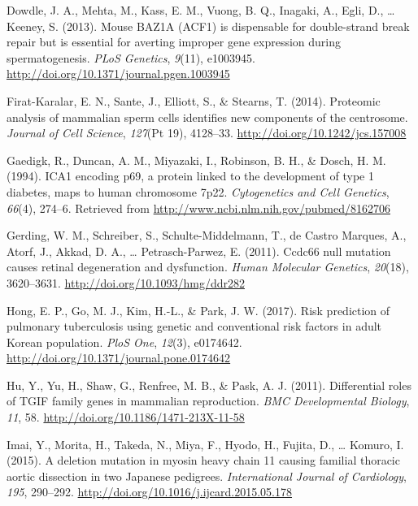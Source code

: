 \documentclass[12pt,twoside]{reedthesis}
\theoremstyle{definition}
\theoremstyle{definition}
\theoremstyle{remark}
\begin{document}
  \hypertarget{ref-Dowdle2013}{}
  Dowdle, J. A., Mehta, M., Kass, E. M., Vuong, B. Q., Inagaki, A., Egli,
  D., \ldots{} Keeney, S. (2013). Mouse BAZ1A (ACF1) is dispensable for
  double-strand break repair but is essential for averting improper gene
  expression during spermatogenesis. \emph{PLoS Genetics}, \emph{9}(11),
  e1003945. \url{http://doi.org/10.1371/journal.pgen.1003945}
  
  \hypertarget{ref-Firat-Karalar2014}{}
  Firat-Karalar, E. N., Sante, J., Elliott, S., \& Stearns, T. (2014).
  Proteomic analysis of mammalian sperm cells identifies new components of
  the centrosome. \emph{Journal of Cell Science}, \emph{127}(Pt 19),
  4128--33. \url{http://doi.org/10.1242/jcs.157008}
  
  \hypertarget{ref-Gaedigk1994}{}
  Gaedigk, R., Duncan, A. M., Miyazaki, I., Robinson, B. H., \& Dosch, H.
  M. (1994). ICA1 encoding p69, a protein linked to the development of
  type 1 diabetes, maps to human chromosome 7p22. \emph{Cytogenetics and
  Cell Genetics}, \emph{66}(4), 274--6. Retrieved from
  \url{http://www.ncbi.nlm.nih.gov/pubmed/8162706}
  
  \hypertarget{ref-Gerding2011}{}
  Gerding, W. M., Schreiber, S., Schulte-Middelmann, T., de Castro
  Marques, A., Atorf, J., Akkad, D. A., \ldots{} Petrasch-Parwez, E.
  (2011). Ccdc66 null mutation causes retinal degeneration and
  dysfunction. \emph{Human Molecular Genetics}, \emph{20}(18), 3620--3631.
  \url{http://doi.org/10.1093/hmg/ddr282}
  
  \hypertarget{ref-Hong2017}{}
  Hong, E. P., Go, M. J., Kim, H.-L., \& Park, J. W. (2017). Risk
  prediction of pulmonary tuberculosis using genetic and conventional risk
  factors in adult Korean population. \emph{PloS One}, \emph{12}(3),
  e0174642. \url{http://doi.org/10.1371/journal.pone.0174642}
  
  \hypertarget{ref-Hu2011}{}
  Hu, Y., Yu, H., Shaw, G., Renfree, M. B., \& Pask, A. J. (2011).
  Differential roles of TGIF family genes in mammalian reproduction.
  \emph{BMC Developmental Biology}, \emph{11}, 58.
  \url{http://doi.org/10.1186/1471-213X-11-58}
  
  \hypertarget{ref-Imai2015}{}
  Imai, Y., Morita, H., Takeda, N., Miya, F., Hyodo, H., Fujita, D.,
  \ldots{} Komuro, I. (2015). A deletion mutation in myosin heavy chain 11
  causing familial thoracic aortic dissection in two Japanese pedigrees.
  \emph{International Journal of Cardiology}, \emph{195}, 290--292.
  \url{http://doi.org/10.1016/j.ijcard.2015.05.178}
  
\end{document}
